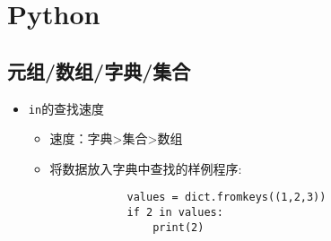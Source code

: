 \chapter{Python}

\section{元组/数组/字典/集合}

\begin{itemize}
    \item \texttt{in}的查找速度
    \begin{itemize}
        \item 速度：字典>集合>数组 
        \item 将数据放入字典中查找的样例程序:
        \begin{verbatim}
            values = dict.fromkeys((1,2,3))
            if 2 in values:
                print(2)
        \end{verbatim}
    \end{itemize}
\end{itemize}
